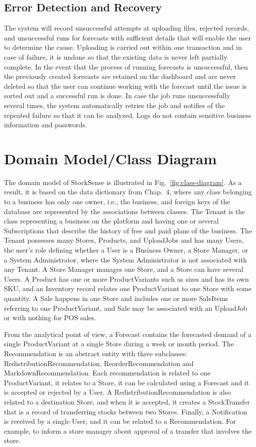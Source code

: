 \documentclass{StockSense}
\begin{document}
\subsection{Error Detection and Recovery}

The system will record unsuccessful attempts at uploading files, rejected records, and unsuccessful runs for forecasts with sufficient details that will enable the user to determine the cause. Uploading is carried out within one transaction and in case of failure, it is undone so that the existing data is never left partially complete. In the event that the process of running forecasts is unsuccessful, then the previously created forecasts are retained on the dashboard and are never deleted so that the user can continue working with the forecast until the issue is sorted out and a successful run is done. In case the job runs unsuccessfully several times, the system automatically retries the job and notifies of the repeated failure so that it can be analyzed. Logs do not contain sensitive business information and passwords.

\section{Domain Model/Class Diagram}

The domain model of StockSense is illustrated in Fig.~\ref{fig:class-diagram}. As a result, it is based on the data dictionary from Chap.~4, where any class belonging to a business has only one owner, i.e., the business, and foreign keys of the database are represented by the associations between classes. The Tenant is the class representing a business on the platform and having one or several Subscriptions that describe the history of free and paid plans of the business. The Tenant possesses many Stores, Products, and UploadJobs and has many Users, the user's role defining whether a User is a Business Owner, a Store Manager, or a System Administrator, where the System Administrator is not associated with any Tenant. A Store Manager manages one Store, and a Store can have several Users. A Product has one or more ProductVariants such as sizes and has its own SKU, and an Inventory record relates one ProductVariant to one Store with some quantity. A Sale happens in one Store and includes one or more SaleItems referring to one ProductVariant, and Sale may be associated with an UploadJob or with nothing for POS sales.

From the analytical point of view, a Forecast contains the forecasted demand of a single ProductVariant at a single Store during a week or month period. The Recommendation is an abstract entity with three subclasses: RedistributionRecommendation, ReorderRecommendation and MarkdownRecommendation. Each recommendation is related to one ProductVariant, it relates to a Store, it can be calculated using a Forecast and it is accepted or rejected by a User. A RedistributionRecommendation is also related to a destination Store, and when it is accepted, it creates a StockTransfer that is a record of transferring stocks between two Stores. Finally, a Notification is received by a single User, and it can be related to a Recommendation. For example, to inform a store manager about approval of a transfer that involves the store.
\end{document}
